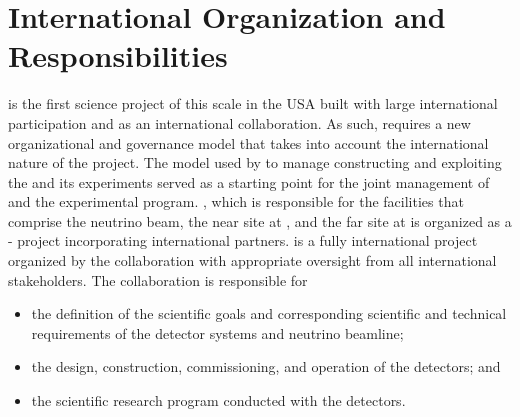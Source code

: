 \section{International Organization and Responsibilities}

 is the first science project of this scale in the USA built with large
international participation and as an international collaboration. As such,  requires a new organizational and governance model that takes into account the international nature of the project.
The
model used by  to manage constructing and exploiting the  and its experiments served as a starting point for the joint management of  and the  experimental program.   
, which is responsible for the facilities that comprise the neutrino beam, the near site at , and the far site at \surf is organized as a
- project incorporating international partners. 
 is a fully international project
organized by the  collaboration with appropriate oversight from all international stakeholders.
The  collaboration is responsible for
\begin{itemize}
\item the definition of the scientific goals and corresponding scientific and technical requirements of the detector systems and neutrino beamline;
\item the design, construction, commissioning, and operation of the detectors; and
\item the scientific research program conducted with the  detectors. 
\end{itemize}

